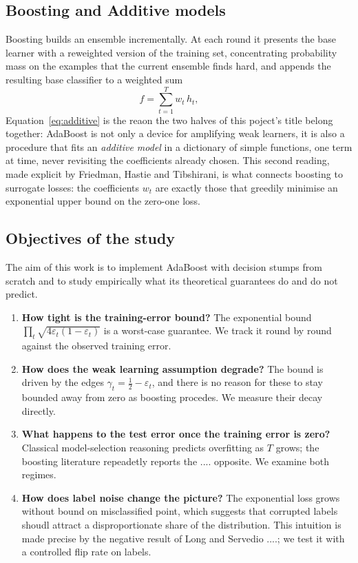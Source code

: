 \documentclass[a4paper, 10pt]{article}
\begin{document}
\subsection{Boosting and Additive models}
Boosting builds an ensemble incrementally. At each round it presents the base learner with a reweighted version of the training set, concentrating probability mass on the examples that the current ensemble finds hard, and appends the resulting base classifier to a weighted sum
\begin{equation}\label{eq:additive}
    f = \sum_{t=1}^T w_t\, h_t, \qquad 
\end{equation}
Equation~\eqref{eq:additive} is the reaon the two halves of this poject's title belong together: AdaBoost is not only a device for amplifying weak learners, it is also a procedure that fits an \emph{additive model} in a dictionary of simple functions, one term at time, never revisiting the coefficients already chosen. This second reading, made explicit by Friedman, Hastie and Tibshirani, is what connects boosting to surrogate losses: the coefficients $w_t$ are exactly those that greedily minimise an exponential upper bound on the zero-one loss.

\subsection{Objectives of the study}
The aim of this work is to implement AdaBoost with decision stumps from scratch and to study empirically what its theoretical guarantees do and do not predict. 
\begin{enumerate}
    \item \textbf{How tight is the training-error bound?} The exponential bound $\prod_t \sqrt{4\varepsilon_t(1-\varepsilon_t)}$ is a worst-case guarantee. We track it round by round against the observed training error.
    \item \textbf{How does the weak learning assumption degrade?} The bound is driven by the edges $\gamma_t = \tfrac12 - \varepsilon_t$, and there is no reason for these to stay bounded away from zero as boosting procedes. We measure their decay directly.
    \item \textbf{What happens to the test error once the training error is zero?} Classical model-selection reasoning predicts overfitting as $T$ grows; the boosting literature repeadetly reports the .... opposite. We examine both regimes.
    \item \textbf{How does label noise change the picture?} The exponential loss grows without bound on misclassified point, which suggests that corrupted labels shoudl attract a disproportionate share of the distribution. This intuition is made precise by the negative result of Long and Servedio ....; we test it with a controlled flip rate on labels.
\end{enumerate}
\end{document}
